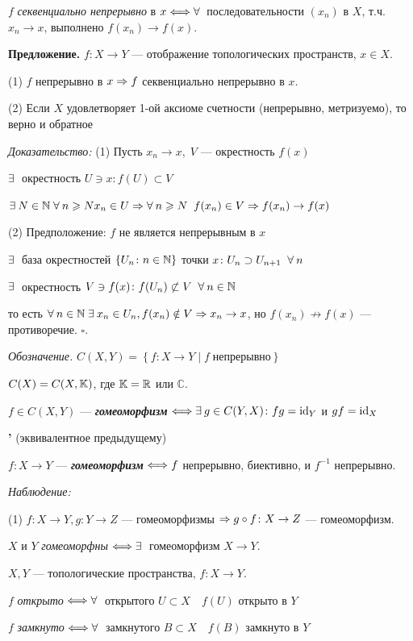 \documentclass[../../main.tex]{subfiles}
\begin{document}
$f$ \textit{секвенциально непрерывно} в $x \Longleftrightarrow \forall\:$ последовательности $(x_n)$ в $X$, т.ч. $x_n \to x$, выполнено $f(x_n) \to f(x)$.

\textbf{Предложение.} $f \colon X \to Y$ — отображение топологических пространств, $x \in X$.

(1) $f$ непрерывно в $x \Rightarrow f$ секвенциально непрерывно в $x$.

(2) Если $X$ удовлетворяет 1-ой аксиоме счетности (непрерывно, метризуемо), то верно и обратное

\textit{Доказательство:} (1) Пусть $x_n \to x, \; V$ — окрестность $f(x)$

$\exists\: $ окрестность $U \ni x \colon f(U) \subset V$

$\exists\: N \in \mathbb{N} \; \forall\: n \geqslant N x_n \in U \Rightarrow \forall\: n \geqslant N \;\; f(x_n) \in V \Rightarrow f(x_n) \to f(x)$

(2) Предположение: $f$ не является непрерывным в $x$

$\exists\:$ база окрестностей $\left\{ U_n \colon n \in \mathbb{N} \right\}$ точки $x \colon U_n \supset U_{n+1}\;\; \forall\: n$

$\exists\:$ окрестность $V \ni f(x) \colon f(U_n) \not\subset V \;\; \forall\: n \in \mathbb{N}$

то есть $\forall\: n \in \mathbb{N} \; \exists\: x_n \in U_n, f(x_n) \notin V \Rightarrow x_n \to x$, но $f(x_n) \not\to f(x)$ — противоречие. $\square$.

\textit{Обозначение.} $C(X, Y) = \left\{f \colon X \rightarrow Y \;|\; f \; непрерывно \right\}$

$C(X) = C(X, \mathbb{K})$, где $\mathbb{K} = \mathbb{R}$ или $\mathbb{C}$.

 $f \in C(X, Y)$ — \textit{\textbf{гомеоморфизм}} $\Longleftrightarrow \exists\: g \in C(Y, X) \colon fg = \operatorname{id}_{Y}$ и $gf = \operatorname{id}_X$

\textbf{'} (эквивалентное предыдущему)

$f \colon X \to Y $ — \textit{\textbf{гомеоморфизм}} $\Longleftrightarrow f$ непрерывно, биективно, и $f^{-1}$ непрерывно.

\textit{Наблюдение:} 

(1) $f\colon X \to Y, g\colon Y \to Z$ — гомеоморфизмы $\Rightarrow g \circ f \colon X \to Z$ — гомеоморфизм.

 $X$ и $Y$ \textit{гомеоморфны} $\Longleftrightarrow \exists\:$ гомеоморфизм $X \to Y$.

 $X, Y$ — топологические пространства, $f\colon X \to Y$.

$f$ \textit{открыто} $\Longleftrightarrow \forall\:$ открытого $U \subset X \quad f(U)$ открыто в $Y$

$f$ \textit{замкнуто} $\Longleftrightarrow \forall\:$ замкнутого $B \subset X \quad f(B)$ замкнуто в $Y$
\end{document}
